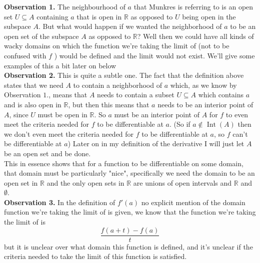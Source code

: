 	\textbf{Observation 1.}  The neighbourhood of $a$ that Munkres is referring to is an open set $U \subseteq A$  containing $a$ that is open in $\mathbb{R}$ as opposed to $U$ being open in the subspace $A$. But what would happen if we wanted the neighborhood of $a$ to be an open set of the subspace $A$ as opposed to $\mathbb{R}$? Well then we could have all kinds of wacky domains on which the function  we're taking the limit of (not to be confused with $f$ ) would be defined and the limit would not exist. We'll give some examples of this a bit later on below \\
	
	\textbf{Observation 2.} This is quite a subtle one. The fact that the definition above states that we need $A$ to contain a neighborhood of $a$ which, as we know by Observation $1.$, means that $A$ needs to contain a subset $U \subseteq A$ which contains $a$ and is also open in $\mathbb{R}$, but then this means that $a$ needs to be an interior point of $A$, since $U$ must be open in $\mathbb{R}$. So $a$ must be an interior point of $A$ for $f$ to even meet the criteria needed for $f$ to be differentiable at $a$. (So if $a\not\in \operatorname{Int}(A)$ then we don't even meet the criteria needed for $f$ to be differentiable at $a$, so $f$ can't be differentiable at $a$) Later on in my definition of the derivative I will just let $A$ be an open set and be done. \\
	
	This in essence shows that for a function to be differentiable on some domain, that domain must be particularly "nice", specifically we need the domain to be an open set in $\mathbb{R}$ and the only open sets in $\mathbb{R}$ are unions of open intervals and $\mathbb{R}$ and $\emptyset$. \\ 
		
	\textbf{Observation 3.} In the definition of $f'(a)$ no explicit mention of the domain function we're taking the limit of is given, we know that the function we're taking the limit of is $$\frac{f(a+t) - f(a)}{t}$$ but it is unclear over what domain this function is defined, and it's unclear if the criteria needed to take the limit of this function is satisfied. \\
	

